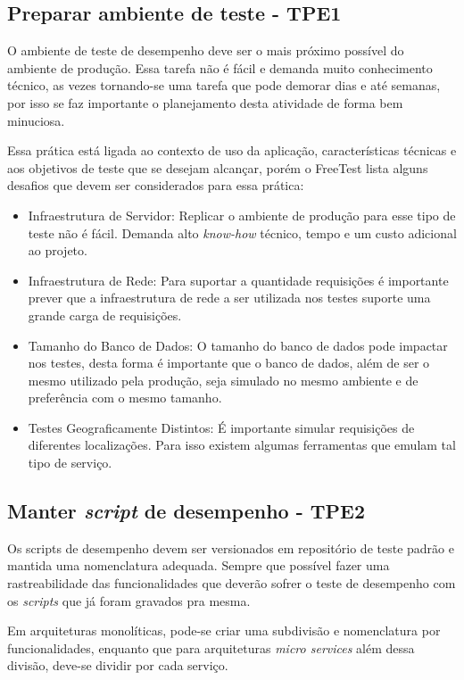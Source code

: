 \subsection{Preparar ambiente de teste - TPE1}
\label{sec:guiatpe1}

O ambiente de teste de desempenho deve ser o mais próximo possível do ambiente de produção. Essa tarefa não é fácil e demanda muito conhecimento técnico, as vezes tornando-se uma tarefa que pode demorar dias e até semanas, por isso se faz importante o planejamento desta atividade de forma bem minuciosa.

Essa prática está ligada ao contexto de uso da aplicação, características técnicas e aos objetivos de teste que se desejam alcançar, porém o FreeTest lista alguns desafios que devem ser considerados para essa prática:

\begin{itemize}
	\item Infraestrutura de Servidor: Replicar o ambiente de produção para esse tipo de teste não é fácil. Demanda alto \textit{know-how} técnico, tempo e um custo adicional ao projeto.
	\item Infraestrutura de Rede: Para suportar a quantidade requisições é importante prever que a infraestrutura de rede a ser utilizada nos testes suporte uma grande carga de requisições.
	\item Tamanho do Banco de Dados: O tamanho do banco de dados pode impactar nos testes, desta forma é importante que o banco de dados, além de ser o mesmo utilizado pela produção, seja simulado no mesmo ambiente e de preferência com o mesmo tamanho.
	\item Testes Geograficamente Distintos: É importante simular requisições de diferentes localizações. Para isso existem algumas ferramentas que emulam tal tipo de serviço.
\end{itemize}


\subsection{Manter \textit{script} de desempenho - TPE2}
\label{sec:guiatpe2}

Os scripts de desempenho devem ser versionados em repositório de teste padrão e mantida uma nomenclatura adequada. Sempre que possível fazer uma rastreabilidade das funcionalidades que deverão sofrer o teste de desempenho com os \textit{scripts} que já foram gravados pra mesma.

Em arquiteturas monolíticas, pode-se criar uma subdivisão e nomenclatura por funcionalidades, enquanto que para arquiteturas \textit{micro services} além dessa divisão, deve-se dividir por cada  serviço.


